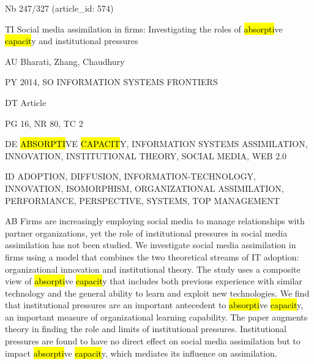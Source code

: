 \documentclass[a4paper]{article}
\begin{document}
\vspace*{-2cm}
Nb \tabto{0cm}247/327 (article\_id: 574)\par
TI \tabto{0cm}Social media assimilation in firms: Investigating the roles of \hl{absorpti}ve \hl{capacit}y and institutional pressures\par
AU \tabto{0cm}Bharati, Zhang, Chaudhury\par
PY \tabto{0cm}2014, SO INFORMATION SYSTEMS FRONTIERS\par
DT \tabto{0cm}Article\par
PG \tabto{0cm}16, NR 80, TC 2\par
DE \tabto{0cm}\hl{ABSORPTI}VE \hl{CAPACIT}Y, INFORMATION SYSTEMS ASSIMILATION, INNOVATION, INSTITUTIONAL THEORY, SOCIAL MEDIA, WEB 2.0\par
ID \tabto{0cm}ADOPTION, DIFFUSION, INFORMATION-TECHNOLOGY, INNOVATION, ISOMORPHISM, ORGANIZATIONAL ASSIMILATION, PERFORMANCE, PERSPECTIVE, SYSTEMS, TOP MANAGEMENT\par
AB \tabto{0cm}Firms are increasingly employing social media to manage relationships with partner organizations, yet the role of institutional pressures in social media assimilation has not been studied. We investigate social media assimilation in firms using a model that combines the two theoretical streams of IT adoption: organizational innovation and institutional theory. The study uses a composite view of \hl{absorpti}ve \hl{capacit}y that includes both previous experience with similar technology and the general ability to learn and exploit new technologies. We find that institutional pressures are an important antecedent to \hl{absorpti}ve \hl{capacit}y, an important measure of organizational learning capability. The paper augments theory in finding the role and limits of institutional pressures. Institutional pressures are found to have no direct effect on social media assimilation but to impact \hl{absorpti}ve \hl{capacit}y, which mediates its influence on assimilation.\par
\clearpage
\end{document}
